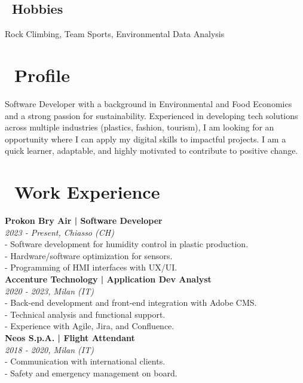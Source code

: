 \documentclass[a4paper,12pt]{article}
\begin{document}
\begin{paracol}{2}
\begin{flushleft}
\begin{tcolorbox}[colback=Goldenrod, colframe=lightgray, boxrule=0pt, left=0mm, right=0mm, top=0mm, bottom=0mm, width=\linewidth, enlarge left by=0mm, enlarge right by=0mm]
    \section{\faHeart\ Hobbies}
    Rock Climbing, Team Sports, Environmental Data Analysis
    \vspace{0.5cm}
\end{tcolorbox}
\end{flushleft}

\switchcolumn 


\section{\faUser\ Profile}

\noindent Software Developer with a background in Environmental and Food Economics and a strong passion for sustainability. Experienced in developing tech solutions across multiple industries (plastics, fashion, tourism), I am looking for an opportunity where I can apply my digital skills to impactful projects. I am a quick learner, adaptable, and highly motivated to contribute to positive change.

\section{\faBriefcase\ Work Experience}

\textbf{Prokon Bry Air | Software Developer}\\
\textit{2023 - Present, Chiasso (CH)}\\
- Software development for humidity control in plastic production.\\
- Hardware/software optimization for sensors.\\
- Programming of HMI interfaces with UX/UI.\\[0.2cm]

\textbf{Accenture Technology | Application Dev Analyst}\\
\textit{2020 - 2023, Milan (IT)}\\
- Back-end development and front-end integration with Adobe CMS.\\
- Technical analysis and functional support.\\
- Experience with Agile, Jira, and Confluence.\\[0.2cm]

\textbf{Neos S.p.A. | Flight Attendant}\\
\textit{2018 - 2020, Milan (IT)}\\
- Communication with international clients.\\
- Safety and emergency management on board.


\end{paracol}
\end{document}

